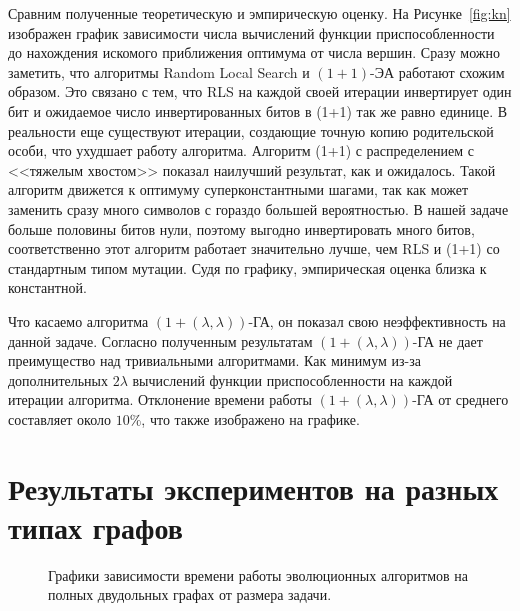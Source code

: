 \documentclass[times]{itmo-student-thesis}
\newcommand{\alglambdaf}{${(1 + (\lambda , \lambda))}$-ГА\xspace}
\newcommand{\oea}{\mbox{$(1 + 1)$-ЭА}\xspace}
\begin{document}
Сравним полученные теоретическую и эмпирическую оценку.
На Рисунке~\ref{fig:kn} изображен график зависимости числа вычислений функции приспособленности до нахождения искомого приближения оптимума от числа вершин.
Сразу можно заметить, что алгоритмы Random Local Search и \oea работают схожим образом.
Это связано с тем, что RLS на каждой своей итерации инвертирует один бит и ожидаемое число инвертированных битов в (1+1) так же равно единице. В реальности еще существуют итерации, создающие точную копию родительской особи, что ухудшает работу алгоритма.
Алгоритм (1+1) с распределением с <<тяжелым хвостом>> показал наилучший результат, как и ожидалось. Такой алгоритм движется к оптимуму суперконстантными шагами, так как может заменить сразу много символов с гораздо большей вероятностью. В нашей задаче больше половины битов нули, поэтому выгодно инвертировать много битов, соответственно этот алгоритм работает значительно лучше, чем RLS и (1+1) со стандартным типом мутации. Судя по графику, эмпирическая оценка близка к константной.

Что касаемо алгоритма \alglambdaf, он показал свою неэффективность на данной задаче. Согласно полученным результатам \alglambdaf не дает преимущество над тривиальными алгоритмами. Как минимум из-за дополнительных $2\lambda$ вычислений функции приспособленности на каждой итерации алгоритма.
Отклонение времени работы \alglambdaf от среднего составляет около $10\%$, что также изображено на графике.

\section{Результаты экспериментов на разных типах графов}

\begin{figure}[t!]
\caption{Графики зависимости времени работы эволюционных алгоритмов на полных двудольных графах от размера задачи.}
\label{fig:knn}
\end{figure}
\end{document}
